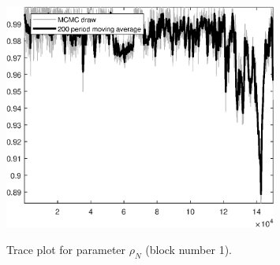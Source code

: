 \begin{figure}[H]
\centering
  \includegraphics[width=0.8\textwidth]{BRS_sectoral_KK/graphs/TracePlot_rho_N_blck_1}\\
    \caption{Trace plot for parameter ${\rho_N}$ (block number 1).}
\end{figure}
